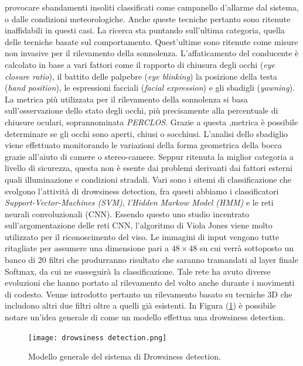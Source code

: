 provocare sbandamenti insoliti classificati come campanello d'allarme dal 
sistema, o dalle condizioni meteorologiche. Anche queste tecniche pertanto 
sono ritenute inaffidabili in questi casi. La ricerca sta puntando sull'ultima 
categoria, quella delle tecniche basate sul comportamento. Quest'ultime 
sono ritenute come misure non invasive per il rilevamento della sonnolenza. 
L'affaticamento del conducente è calcolato in base a vari fattori come il 
rapporto di chiusura degli occhi (\emph{eye closure ratio}), il battito delle palpebre 
(\emph{eye blinking}) la posizione della testa (\emph{hand position}), le espressioni facciali 
(\emph{facial expression}) e gli sbadigli (\emph{yawning}). La metrica più utilizzata per 
il rilevamento della sonnolenza si basa sull'osservazione dello stato degli 
occhi, più precisamente alla percentuale di chiusure oculari, soprannominata 
\emph{PERCLOS}. Grazie a questa ,metrica è possibile determinare se gli occhi 
sono aperti, chiusi o socchiusi. L'analisi dello sbadiglio viene effettuato 
monitorando le variazioni della forma geometrica della bocca grazie all'aiuto 
di camere o stereo-camere. Seppur ritenuta la miglior categoria a livello 
di sicurezza, questa non è esente dai problemi derivanti dai fattori esterni 
quali illuminazione e condizioni stradali. Vari sono i sitemi di classificazione 
che svolgono l'attività di drowsiness detection, fra questi abbiamo i classificatori 
\emph{Support-Vector-Machines (SVM)}, \emph{l'Hidden Markow Model (HMM)} 
e le reti neurali convoluzionali (CNN). Essendo questo uno studio incentrato 
sull'argomentazione delle reti CNN, l'algoritmo di Viola Jones \cite{viola2001rapid} 
viene molto utilizzato per il riconoscimento del viso. Le immagini di input 
vengono tutte ritagliate per assumere una dimensione pari a $48\times 48$ su 
cui verrà sottoposto un banco di 20 filtri che produrranno risultato che saranno 
tramandati al layer finale Softmax, da cui ne susseguirà la classificazione. 
Tale rete ha avuto diverse evoluzioni che hanno portato al rilevamento del 
volto anche durante i movimenti di codesto. Venne introdotto pertanto un 
rilevamento basato su tecniche 3D che includono altri due filtri oltre a quelli 
già esistenti. In Figura (\ref{drow-det}) è possibile notare un'idea generale di come un 
modello effettua una drowsiness detection.
\begin{figure}
    \centering
    \texttt{[image: drowsiness detection.png]}
    \centering
    \caption{Modello generale del sistema di Drowsiness detection.}
    \label{drow-det}
\end{figure}

